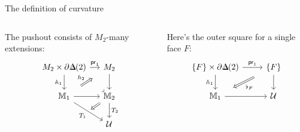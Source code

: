 \begin{frame}{The definition of curvature}
\begin{mydef}[cont.]
\begin{columns}[t]
\begin{column}{0.55\textwidth}
The pushout consists of \( M_2 \)-many extensions:
\[\begin{tikzcd}[ampersand replacement=\&, column sep=small]
  {M_2\times \partial\Dd(2)} \& {M_2} \\
  {\mathbb{M}_{1}} \& {\mathbb{M}_2} \\
  \& {\mathcal{U}}
  \arrow["{\mathrm{pr}_1}", from=1-1, to=1-2]
  \arrow["{\mathbb{A}_{1}}"', from=1-1, to=2-1]
  \arrow["{}", from=1-2, to=2-2]
  \arrow["{h_2}", shorten <=10pt, shorten >=10pt, Rightarrow, from=2-1, to=1-2]
  \arrow["{}", from=2-1, to=2-2]
  \arrow[""{name=0, anchor=center, inner sep=0}, "{T_{1}}"', from=2-1, to=3-2]
  \arrow["\ulcorner"{pos=-0.05, rotate=180}, shift left=1.5, draw=none, from=2-2, to=1-1]
  \arrow["{T_2}", from=2-2, to=3-2]
  \arrow["{}", shorten >=3pt, Rightarrow, from=2-2, to=0]
\end{tikzcd}\]
\end{column}
\begin{column}{0.45\textwidth}
Here's the outer square for a single face \( F \):
\[\begin{tikzcd}[ampersand replacement=\&]
  {\{F\}\times \partial\Dd(2)} \& \{F\} \\
  {\mathbb{M}_{1}} \& {\mathcal{U}}
  \arrow["{\pr_1}", from=1-1, to=1-2]
  \arrow["{\mathbb{A}_{1}}"', from=1-1, to=2-1]
  \arrow["{}", from=1-2, to=2-2]
  \arrow["{\flat_F}", shorten <=11pt, shorten >=11pt, Rightarrow, from=1-2, to=2-1]
  \arrow[from=2-1, to=2-2]
\end{tikzcd}\]
\end{column}
\end{columns}

\end{mydef}
\end{frame}

% 

